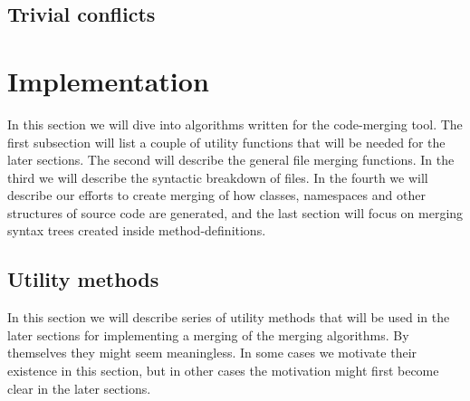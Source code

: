 \documentclass[11pt]{article}
\begin{document}
\subsection{Trivial conflicts}



\clearpage
\section{Implementation}
In this section we will dive into algorithms written for the code-merging tool. The first subsection will list a couple of utility functions that will be needed for the later sections. The second will describe the general file merging functions. In the third we will describe the syntactic breakdown of files. In the fourth we will describe our efforts to create merging of how classes, namespaces and other structures of source code are generated, and the last section will focus on merging syntax trees created inside method-definitions.

\subsection{Utility methods}
In this section we will describe series of utility methods that will be used in the later sections for implementing a merging of the merging algorithms. By themselves they might seem meaningless. In some cases we motivate their existence in this section, but in other cases the motivation might first become clear in the later sections.
\end{document}
